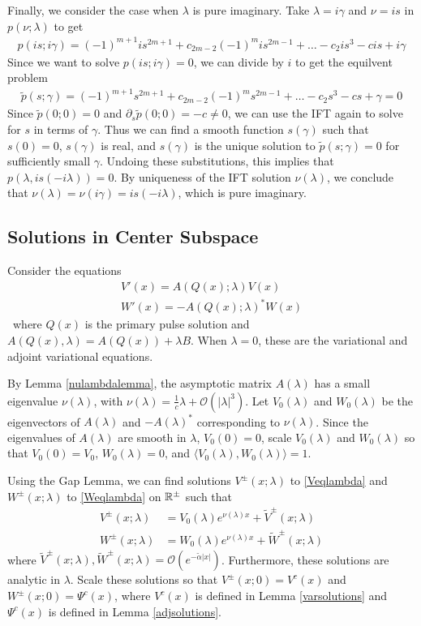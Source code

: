 \documentclass[thesis.tex]{subfiles}
\begin{document}
Finally, we consider the case when $\lambda$ is pure imaginary. Take $\lambda = i \gamma$ and $\nu = i s$ in $p(\nu; \lambda)$ to get
\begin{align*}
p(i s; i \gamma) = (-1)^{m+1} i s^{2m+1} + c_{2m-2} (-1)^m i s^{2m-1} + \dots - c_2 i s^3 - c i s + i \gamma
\end{align*}
Since we want to solve $p(i s; i \gamma) = 0$, we can divide by $i$ to get the equilvent problem
\begin{align*}
\tilde{p}(s; \gamma) = (-1)^{m+1} s^{2m+1} + c_{2m-2} (-1)^m s^{2m-1} + \dots - c_2 s^3 - c s + \gamma = 0
\end{align*}
Since $\tilde{p}(0; 0) = 0$ and $\partial_s \tilde{p}(0; 0) = -c \neq 0$, we can use the IFT again to solve for $s$ in terms of $\gamma$. Thus we can find a smooth function $s(\gamma)$ such that $s(0) = 0$, $s(\gamma)$ is real, and $s(\gamma)$ is the unique solution to $\tilde{p}(s; \gamma) = 0$ for sufficiently small $\gamma$. Undoing these substitutions, this implies that $p(\lambda, i s(-i \lambda)) = 0$. By uniqueness of the IFT solution $\nu(\lambda)$, we conclude that $\nu(\lambda) = \nu(i \gamma) = i s(-i \lambda)$, which is pure imaginary.

\subsection{Solutions in Center Subspace}

Consider the equations
\begin{align}
V'(x) = A(Q(x); \lambda) V(x) \label{Veqlambda} \\
W'(x) = -A(Q(x); \lambda)^* W(x) \label{Weqlambda}
\end{align}\
where $Q(x)$ is the primary pulse solution and $A(Q(x), \lambda) = A(Q(x)) + \lambda B$. When $\lambda = 0$, these are the variational and adjoint variational equations.

By Lemma \ref{nulambdalemma}, the asymptotic matrix $A(\lambda)$ has a small eigenvalue $\nu(\lambda)$, with $\nu(\lambda) = \frac{1}{c} \lambda + \mathcal{O}(|\lambda|^3)$. Let $V_0(\lambda)$ and $W_0(\lambda)$ be the eigenvectors of $A(\lambda)$ and $-A(\lambda)^*$ corresponding to $\nu(\lambda)$. Since the eigenvalues of $A(\lambda)$ are smooth in $\lambda$, $V_0(0) = 0$, scale $V_0(\lambda)$ and $W_0(\lambda)$ so that $V_0(0) = V_0$, $W_0(\lambda) = 0$, and $\langle V_0(\lambda), W_0(\lambda) \rangle = 1$.

Using the Gap Lemma, we can find solutions $V^\pm(x; \lambda)$ to \eqref{Veqlambda} and $W^\pm(x; \lambda)$ to \eqref{Weqlambda} on $\mathbb{R}^\pm$ such that
\begin{align*}
V^\pm(x; \lambda) &= V_0(\lambda)e^{\nu(\lambda)x} + \tilde{V}^\pm(x; \lambda) \\
W^\pm(x; \lambda) &= W_0(\lambda)e^{\nu(\lambda)x} + \tilde{W}^\pm(x; \lambda)
\end{align*}
where $\tilde{V}^\pm(x; \lambda), \tilde{W}^\pm(x; \lambda) = \mathcal{O}(e^{-\tilde{\alpha}|x|})$. Furthermore, these solutions are analytic in $\lambda$. Scale these solutions so that $V^\pm(x; 0) = V^c(x)$ and $W^\pm(x; 0) = \Psi^c(x)$, where $V^c(x)$ is defined in Lemma \ref{varsolutions} and $\Psi^c(x)$ is defined in Lemma \ref{adjsolutions}.
\end{document}
